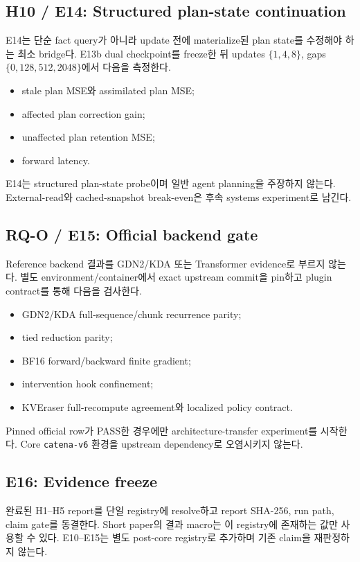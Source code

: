 \documentclass[10.3pt,a4paper]{article}
\begin{document}
\subsection{H10 / E14: Structured plan-state continuation}
E14는 단순 fact query가 아니라 update 전에 materialize된 plan state를 수정해야 하는 최소 bridge다. E13b dual checkpoint를 freeze한 뒤 updates $\{1,4,8\}$, gaps $\{0,128,512,2048\}$에서 다음을 측정한다.

\begin{itemize}
\item stale plan MSE와 assimilated plan MSE;
\item affected plan correction gain;
\item unaffected plan retention MSE;
\item forward latency.
\end{itemize}

E14는 structured plan-state probe이며 일반 agent planning을 주장하지 않는다. External-read와 cached-snapshot break-even은 후속 systems experiment로 남긴다.

\subsection{RQ-O / E15: Official backend gate}
Reference backend 결과를 GDN2/KDA 또는 Transformer evidence로 부르지 않는다. 별도 environment/container에서 exact upstream commit을 pin하고 plugin contract를 통해 다음을 검사한다.

\begin{itemize}
\item GDN2/KDA full-sequence/chunk recurrence parity;
\item tied reduction parity;
\item BF16 forward/backward finite gradient;
\item intervention hook confinement;
\item KVEraser full-recompute agreement와 localized policy contract.
\end{itemize}

Pinned official row가 PASS한 경우에만 architecture-transfer experiment를 시작한다. Core \texttt{catena-v6} 환경을 upstream dependency로 오염시키지 않는다.

\subsection{E16: Evidence freeze}
완료된 H1--H5 report를 단일 registry에 resolve하고 report SHA-256, run path, claim gate를 동결한다. Short paper의 결과 macro는 이 registry에 존재하는 값만 사용할 수 있다. E10--E15는 별도 post-core registry로 추가하며 기존 claim을 재판정하지 않는다.
\end{document}
